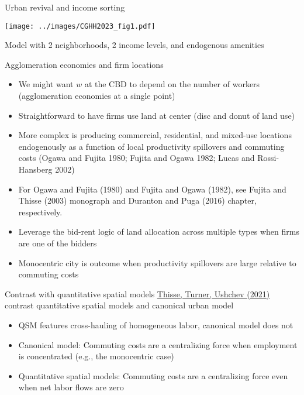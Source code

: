 \documentclass[11pt,notes=hide,aspectratio=169]{beamer}
\begin{document}
\begin{frame}{Urban revival and income sorting}
\begin{center}
\texttt{[image: ../images/CGHH2023\_fig1.pdf]}
\end{center}
\vspace{-4mm}
{\footnotesize Model with 2 neighborhoods, 2 income levels, and endogenous amenities}
\end{frame}
\begin{frame}{Agglomeration economies and firm locations}
\begin{itemize}
\item
We might want $w$ at the CBD to depend on the number of workers (agglomeration economies at a single point)
\item
Straightforward to have firms use land at center (disc and donut of land use)
\item
More complex is producing commercial, residential, and mixed-use locations endogenously 
as a function of local productivity spillovers and commuting costs
(Ogawa and Fujita 1980; Fujita and Ogawa 1982; Lucas and Rossi-Hansberg 2002)
\item
For Ogawa and Fujita (1980) and Fujita and Ogawa (1982),
see Fujita and Thisse (2003) monograph and Duranton and Puga (2016) chapter, respectively.
\item Leverage the bid-rent logic of land allocation across multiple types when firms are one of the bidders
\item Monocentric city is outcome when productivity spillovers are large relative to commuting costs
\end{itemize}
\end{frame}
\begin{frame}{Contrast with quantitative spatial models}
\href{https://matthewturner.org/papers/unpublished/Thisse_Turner_Ushchev_unp_2021.pdf}{Thisse, Turner, Ushchev (2021)}
contrast quantitative spatial models and canonical urban model
\begin{itemize}
\item QSM features cross-hauling of homogeneous labor, canonical model does not
\item Canonical model: Commuting costs are a centralizing force when employment is concentrated (e.g., the monocentric case)
\item Quantitative spatial models: Commuting costs are a centralizing force even when net labor flows are zero
\end{itemize}
\end{frame}
\end{document}
